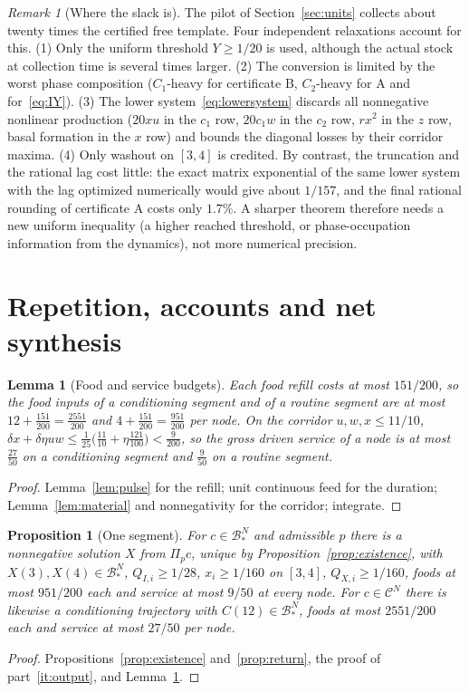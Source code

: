 \documentclass[11pt,a4paper]{article}
\theoremstyle{plain}
\newtheorem{proposition}[theorem]{Proposition}
\newtheorem{lemma}[theorem]{Lemma}
\theoremstyle{definition}
\theoremstyle{remark}
\newtheorem{remark}[theorem]{Remark}
\newcommand{\Adm}{\mathcal C}
\newcommand{\Bstar}{\mathcal B_*}
\newcommand{\Pulse}{\Pi}
\newcommand{\Iv}{I}
\begin{document}
\begin{remark}[Where the slack is]\label{rem:slack}
The pilot of Section~\ref{sec:units} collects about twenty times the certified free template. Four independent relaxations account for this. (1) Only the uniform threshold $Y\ge1/20$ is used, although the actual stock at collection time is several times larger. (2) The conversion is limited by the worst phase composition ($C_1$-heavy for certificate B, $C_2$-heavy for A and for~\eqref{eq:IY}). (3) The lower system~\eqref{eq:lowersystem} discards all nonnegative nonlinear production ($20xu$ in the $c_1$ row, $20c_1w$ in the $c_2$ row, $rx^2$ in the $z$ row, basal formation in the $x$ row) and bounds the diagonal losses by their corridor maxima. (4) Only washout on $[3,4]$ is credited. By contrast, the truncation and the rational lag cost little: the exact matrix exponential of the same lower system with the lag optimized numerically would give about $1/157$, and the final rational rounding of certificate A costs only $1.7\%$. A sharper theorem therefore needs a new uniform inequality (a higher reached threshold, or phase-occupation information from the dynamics), not more numerical precision.
\end{remark}

\section{Repetition, accounts and net synthesis}\label{sec:repetition}

\begin{lemma}[Food and service budgets]\label{lem:budgets}
Each food refill costs at most $151/200$, so the food inputs of a conditioning segment and of a routine segment are at most $12+\frac{151}{200}=\frac{2551}{200}$ and $4+\frac{151}{200}=\frac{951}{200}$ per node. On the corridor $u,w,x\le11/10$, $\delta x+\delta\eta uw\le\frac1{25}\bigl(\frac{11}{10}+\eta\frac{121}{100}\bigr)<\frac9{200}$, so the gross driven service of a node is at most $\frac{27}{50}$ on a conditioning segment and $\frac9{50}$ on a routine segment.
\end{lemma}
\begin{proof}
Lemma~\ref{lem:pulse} for the refill; unit continuous feed for the duration; Lemma~\ref{lem:material} and nonnegativity for the corridor; integrate.
\end{proof}

\begin{proposition}[One segment]\label{prop:segment}
For $c\in\Bstar^N$ and admissible $p$ there is a nonnegative solution $X$ from $\Pulse_pc$, unique by Proposition~\ref{prop:existence}, with $X(3),X(4)\in\Bstar^N$, $Q_{\Iv,i}\ge1/28$, $x_i\ge1/160$ on $[3,4]$, $Q_{X,i}\ge1/160$, foods at most $951/200$ each and service at most $9/50$ at every node. For $c\in\Adm^N$ there is likewise a conditioning trajectory with $C(12)\in\Bstar^N$, foods at most $2551/200$ each and service at most $27/50$ per node.
\end{proposition}
\begin{proof}
Propositions~\ref{prop:existence} and~\ref{prop:return}, the proof of part~\ref{it:output}, and Lemma~\ref{lem:budgets}.
\end{proof}
\end{document}
